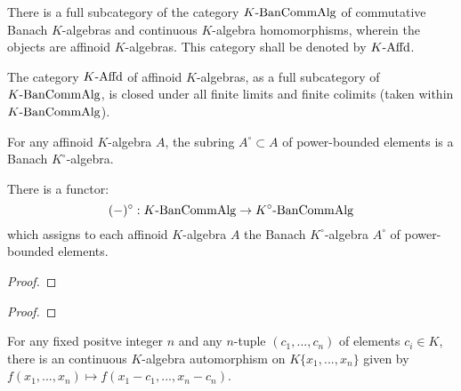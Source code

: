             \begin{corollary}
                There is a full subcategory of the category $K\text{-}\mathrm{Ban}\mathrm{Comm}\mathrm{Alg}$ of commutative Banach $K$-algebras and continuous $K$-algebra homomorphisms, wherein the objects are affinoid $K$-algebras. This category shall be denoted by $K\text{-}\mathrm{Affd}$.
                
                The category $K\text{-}\mathrm{Affd}$ of affinoid $K$-algebras, as a full subcategory of $K\text{-}\mathrm{Ban}\mathrm{Comm}\mathrm{Alg}$, is closed under all finite limits and finite colimits (taken within $K\text{-}\mathrm{Ban}\mathrm{Comm}\mathrm{Alg}$).
            \end{corollary}
            
            \begin{lemma} \label{lemma: power_bounded_subrings_of_affinoid_algebras_are_banach}
                For any affinoid $K$-algebra $A$, the subring $A^{\circ} \subset A$ of power-bounded elements is a Banach $K^{\circ}$-algebra.
            \end{lemma}
            \begin{proposition} \label{prop: unit_discs_are_mapped_to_unit_discs}
                There is a functor:
                    $$(-)^{\circ}: K\text{-}\mathrm{Ban}\mathrm{Comm}\mathrm{Alg} \to K^{\circ}\text{-}\mathrm{Ban}\mathrm{Comm}\mathrm{Alg}$$
                which assigns to each affinoid $K$-algebra $A$ the Banach $K^{\circ}$-algebra $A^{\circ}$ of power-bounded elements. 
            \end{proposition}
                \begin{proof}
                    
                \end{proof}
            \begin{proposition} \label{prop: tate_algebras_are_free_affinoid_algebras}
                
            \end{proposition}
                \begin{proof}
                    
                \end{proof}
            \begin{corollary} \label{coro: recentering_is_an_automorphism}
                For any fixed positve integer $n$ and any $n$-tuple $(c_1, ..., c_n)$ of elements $c_i \in K$, there is an continuous $K$-algebra automorphism on $K\{x_1, ..., x_n\}$ given by $f(x_1, ..., x_n) \mapsto f(x_1 - c_1, ..., x_n - c_n)$.
            \end{corollary}
            
